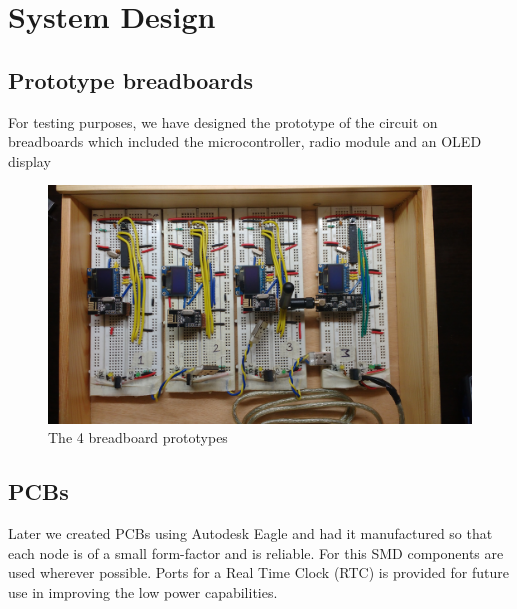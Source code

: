 \documentclass[journal]{IEEEtran}
\begin{document}
\section{System Design}
\subsection{Prototype breadboards}
For testing purposes, we have designed the prototype of the circuit on breadboards which included the microcontroller, radio module and an OLED display

\begin{figure}[ht]
	\centering
	\includegraphics[scale=0.05]{all_breadboards.jpg}
	\caption{The 4 breadboard prototypes}
	\label{fig_bb}
\end{figure}

\subsection{PCBs}
Later we created PCBs using Autodesk Eagle and had it manufactured so that each node is of a small form-factor and is reliable. For this SMD components are used wherever possible. Ports for a Real Time Clock (RTC) is provided for future use in improving the low power capabilities.
\end{document}
